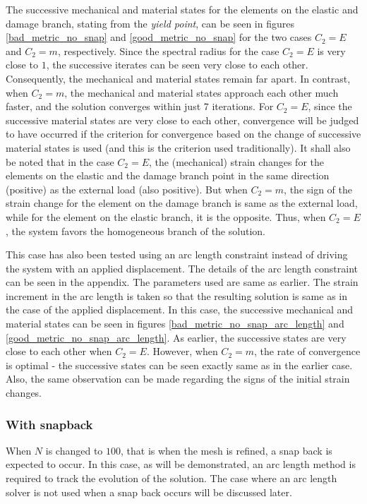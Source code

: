 \documentclass[10pt]{elsarticle}
\begin{document}
The successive mechanical and material states for the elements on the elastic and damage branch, stating from the \textit{yield point}, can be seen in figures \ref{bad_metric_no_snap} and \ref{good_metric_no_snap} for the two cases $C_2=E$ and $C_2=m$, respectively. Since the spectral radius for the case $C_2=E$ is very close to $1$, the successive iterates can be seen very close to each other. Consequently, the mechanical and material states remain far apart. In contrast, when $C_2=m$, the mechanical and material states approach each other much faster, and the solution converges within just 7 iterations. For $C_2=E$, since the successive material states are very close to each other, convergence will be judged to have occurred if the criterion for convergence based on the change of successive material states is used (and this is the criterion used traditionally). It shall also be noted that in the case $C_2=E$, the (mechanical) strain changes for the elements on the elastic and the damage branch point in the same direction (positive) as the external load (also positive). But when $C_2=m$, the sign of the strain change for the element on the damage branch is same as the external load, while for the element on the elastic branch, it is the opposite. Thus, when $C_2=E$, the system favors the homogeneous branch of the solution.

This case has also been tested using an arc length constraint instead of driving the system with an applied displacement. The details of the arc length constraint can be seen in the appendix. The parameters used are same as earlier. The strain increment in the arc length is taken so that the resulting solution is same as in the case of the applied displacement. In this case, the successive mechanical and material states can be seen in figures \ref{bad_metric_no_snap_arc_length} and \ref{good_metric_no_snap_arc_length}. As earlier, the successive states are very close to each other when $C_2=E$. However, when $C_2=m$, the rate of convergence is optimal - the successive states can be seen exactly same as in the earlier case. Also, the same observation can be made regarding the signs of the initial strain changes.

\subsubsection*{With snapback}

When $N$ is changed to $100$, that is when the mesh is refined, a snap back is expected to occur. In this case, as will be demonstrated, an arc length method is required to track the evolution of the solution. The case where an arc length solver is not used when a snap back occurs will be discussed later. 
\end{document}
